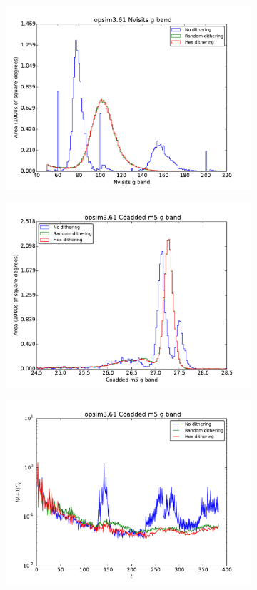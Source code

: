 \documentclass[]{spie}  %
\begin{document}
\begin{figure}
\begin{subfigure}[]{0.3\textwidth}
\centering
\includegraphics[width=.8\textwidth]{figures/opsim3_61__opsim3_61_Nvisits_g_band_HEAL_Histogram}
\caption[]{}
\label{subfig:nvis_hist}
\end{subfigure}
\begin{subfigure}[]{0.3\textwidth}
\centering
\includegraphics[width=.8\textwidth]{figures/opsim3_61__opsim3_61_Coadded_m5_g_band_HEAL_Histogram}
\caption[]{}
\label{subfig:coadd_hist}
\end{subfigure}
\begin{subfigure}[]{0.3\textwidth}
\centering
\includegraphics[width=.8\textwidth]{figures/opsim3_61__opsim3_61_Coadded_m5_g_band_HEAL_PowerSpectrum}

\end{subfigure}
\end{figure}
\end{document}
